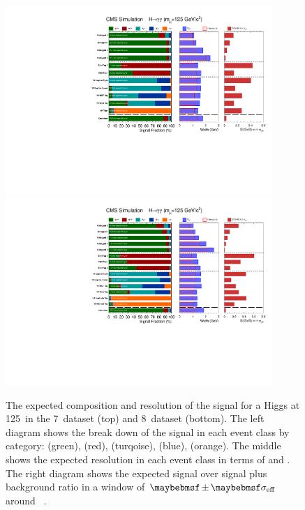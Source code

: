 \begin{figure}
  \begin{center}
    \includegraphics[width=0.9\textwidth]{ch5_anal_and_results/plots/thesis_signal_7TeV/signalComposition.pdf} \\
    \includegraphics[width=0.9\textwidth]{ch5_anal_and_results/plots/thesis_signal_8TeV/signalComposition.pdf}
    \caption{The expected composition and resolution of the signal for a \SM Higgs at 125~\GeV in the 7~\TeV dataset (top) and 8~\TeV dataset (bottom). The left diagram shows the break down of the signal in each event class by category: \ggH (green), \VBF (red), \WH (turqoise), \ZH (blue), \ttH (orange). The middle shows the expected resolution in each event class in terms of \sigeff and \sigFW. The right diagram shows the expected signal over signal plus background ratio in a window of $\pm\sigeff$ around ~\GeV.}
    \label{fig:signal_composition}
  \end{center}
\end{figure}
  
